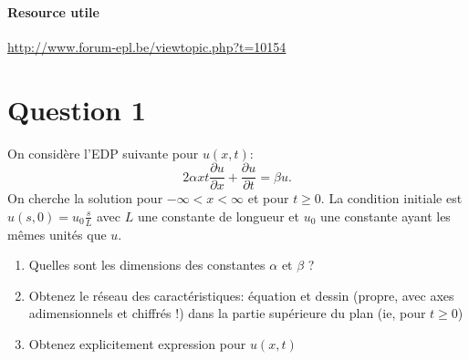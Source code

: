 


\paragraph{Resource utile}
\url{http://www.forum-epl.be/viewtopic.php?t=10154}

\section*{Question 1}
On considère l'EDP suivante pour $u(x,t)$:
$$2\alpha xt\frac{\partial u}{\partial x} + \frac{\partial u}{\partial t} = \beta u.$$
On cherche la solution pour $- \infty < x < \infty$ et pour
$t \geq 0$. La condition initiale est $u(s,0) = u_0\frac{s}{L}$ avec $L$ une constante de longueur et $u_0$ une constante ayant les mêmes unités que $u$.
\begin{enumerate}
\item Quelles sont les dimensions des constantes $\alpha$ et $\beta$ ?
\item Obtenez le réseau des caractéristiques: équation et dessin (propre, avec axes adimensionnels et chiffrés !) dans la partie supérieure du plan (ie, pour $t \geq0$)
\item Obtenez explicitement expression pour $u(x,t)$
\end{enumerate}

